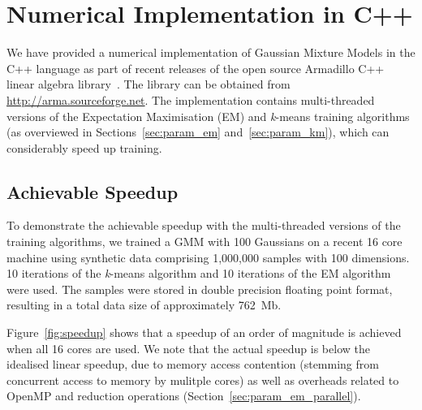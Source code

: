 \section{Numerical Implementation in C++}

We have provided a numerical implementation of Gaussian Mixture Models in the C++ language
as part of recent releases of the open source Armadillo C++ linear algebra library~\cite{Armadillo_JOSS_2016,Armadillo_PASC_2017}.
The library can be obtained from \href{http://arma.sourceforge.net}{http://arma.sourceforge.net}.
The implementation contains multi-threaded versions of the Expectation Maximisation (EM) and {\it k}-means training algorithms
(as overviewed in Sections~\ref{sec:param_em} and~\ref{sec:param_km}),
which can considerably speed up training.

\subsection{Achievable Speedup}

To demonstrate the achievable speedup with the multi-threaded versions of the training algorithms,
we trained a GMM with 100 Gaussians on a recent 16 core machine using synthetic data comprising 1,000,000 samples with 100 dimensions.
10 iterations of the {\it k}-means algorithm and 10 iterations of the EM algorithm were used.
The samples were stored in double precision floating point format, resulting in a total data size of approximately 762~Mb.

Figure~\ref{fig:speedup} shows that a speedup of an order of magnitude is achieved when all 16 cores are used.
We note that the actual speedup is below the idealised linear speedup,
due to memory access contention (stemming from concurrent access to memory by mulitple cores)
as well as overheads related to OpenMP and reduction operations (Section~\ref{sec:param_em_parallel}).


